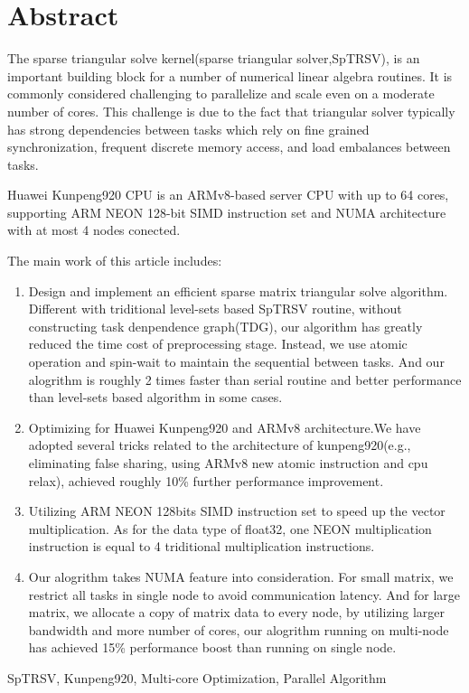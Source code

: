 ﻿\renewcommand{\baselinestretch}{1.5}
\fontsize{12pt}{13pt}\selectfont

\chapter[ABSTRACT(英文摘要)]{Abstract}

The sparse triangular solve kernel(sparse triangular solver,SpTRSV), is an important building block for a number of numerical linear algebra routines. It is commonly considered challenging to parallelize and scale even on a moderate number of cores. This challenge is due to the fact that triangular solver typically has strong dependencies between tasks which rely on fine grained synchronization, frequent discrete memory access, and load embalances between tasks.

Huawei Kunpeng920 CPU is an ARMv8-based server CPU with up to 64 cores, supporting ARM NEON 128-bit SIMD instruction set and NUMA architecture with at most 4 nodes conected.

The main work of this article includes:
\vspace{-12pt}
\begin{enumerate} \setlength{\itemsep}{0pt}
    \item Design and implement an efficient sparse matrix triangular solve algorithm. Different with triditional level-sets based SpTRSV routine, without constructing task denpendence graph(TDG), our algorithm has greatly reduced the time cost of preprocessing stage. Instead, we use atomic operation and spin-wait to maintain the sequential between tasks. And our alogrithm is roughly 2 times faster than serial routine and better performance than level-sets based algorithm in some cases.
    \item Optimizing for Huawei Kunpeng920 and ARMv8 architecture.We have adopted several tricks related to the architecture of kunpeng920(e.g., eliminating false sharing, using ARMv8 new atomic instruction and cpu relax), achieved roughly 10\% further performance improvement.
    \item Utilizing ARM NEON 128bits SIMD instruction set to speed up the vector multiplication. As for the data type of float32, one NEON multiplication instruction is equal to 4 triditional multiplication instructions.
    \item Our alogrithm takes NUMA feature into consideration. For small matrix, we restrict all tasks in single node to avoid communication latency. And for large matrix, we allocate a copy of matrix data to every node, by utilizing larger bandwidth and more number of cores, our alogrithm running on multi-node has achieved 15\% performance boost than running on single node.
\end{enumerate}
\vspace{-12pt}


\vspace{1em}
 \quad SpTRSV, Kunpeng920, Multi-core Optimization, Parallel Algorithm

\clearpage
\endinput